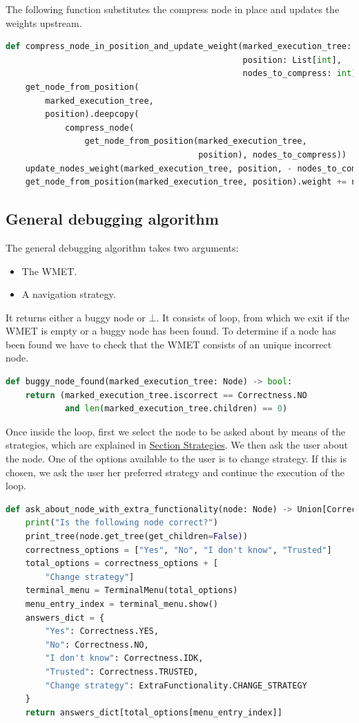 The following function substitutes the compress node in place and updates the weights upstream.
\begin{lstlisting}[language=Python, caption=How to determine if a buggy node has been found]
def compress_node_in_position_and_update_weight(marked_execution_tree: Node,
                                                position: List[int],
                                                nodes_to_compress: int) -> None:
    get_node_from_position(
        marked_execution_tree,
        position).deepcopy(
            compress_node(
                get_node_from_position(marked_execution_tree,
                                       position), nodes_to_compress))
    update_nodes_weight(marked_execution_tree, position, - nodes_to_compress)
    get_node_from_position(marked_execution_tree, position).weight += nodes_to_compress
\end{lstlisting}
\subsection{General debugging algorithm}
The general debugging algorithm takes two arguments:
\begin{itemize}
    \item The WMET.
    \item A navigation strategy.
\end{itemize}
It returns either a buggy node or \(\bot\).
It consists of loop, from which we exit if the WMET is empty or a buggy node has been found.
To determine if a node has been found we have to check that the WMET consists of an unique incorrect node.
\begin{lstlisting}[language=Python, caption=How to determine if a buggy node has been found]
def buggy_node_found(marked_execution_tree: Node) -> bool:
    return (marked_execution_tree.iscorrect == Correctness.NO
            and len(marked_execution_tree.children) == 0)
\end{lstlisting}
Once inside the loop, first we select the node to be asked about by means of the strategies, which are explained in \hyperref[implementation:Strategies]{Section Strategies}.
We then ask the user about the node. One of the options available to the user is to change strategy. If this is chosen, we ask the user her preferred strategy and continue the execution of the loop.
\begin{lstlisting}[language=Python, caption=Function to ask about node]
def ask_about_node_with_extra_functionality(node: Node) -> Union[Correctness, ExtraFunctionality]:
    print("Is the following node correct?")
    print_tree(node.get_tree(get_children=False))
    correctness_options = ["Yes", "No", "I don't know", "Trusted"]
    total_options = correctness_options + [
        "Change strategy"]
    terminal_menu = TerminalMenu(total_options)
    menu_entry_index = terminal_menu.show()
    answers_dict = {
        "Yes": Correctness.YES,
        "No": Correctness.NO,
        "I don't know": Correctness.IDK,
        "Trusted": Correctness.TRUSTED,
        "Change strategy": ExtraFunctionality.CHANGE_STRATEGY
    }
    return answers_dict[total_options[menu_entry_index]]
\end{lstlisting}


